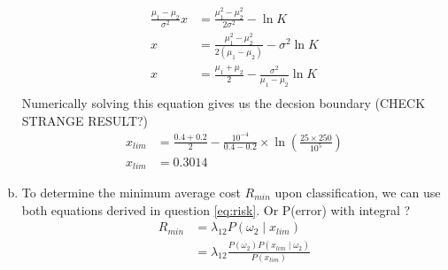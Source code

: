 \documentclass[a4paper, 10pt, twoside]{article}
\begin{document}
\begin{enumerate}[a)]
\begin{align*}
              \frac{\mu_1-\mu_2}{\sigma^2}x                                           & = \frac{\mu_1^2-\mu_2^2}{2\sigma^2} - \ln K                     \\
              x                                                                     & = \frac{\mu_1^2-\mu_2^2}{2(\mu_1-\mu_2)} - \sigma^2\ln K        \\
              x                                                                     & = \frac{\mu_1 + \mu_2}{2} - \frac{\sigma^2}{\mu_1-\mu_2}\ln K   \\
          \end{align*}
          Numerically solving this equation gives us the decsion boundary (CHECK STRANGE RESULT?)
          \begin{align*}
              x_{lim} & = \frac{0.4 + 0.2}{2} - \frac{10^{-4}}{0.4-0.2} \times \ln (\frac{25\times250}{10^5}) \\
              x_{lim} & = 0.3014 
          \end{align*}
    \item To determine the minimum average cost $R_{min}$ upon classification, we can use both equations derived in question \ref{eq:risk}. Or P(error) with integral ?
          \begin{align*}
              R_{min} & = \lambda_{12}P(\omega_2 \mid x_{lim})                                  \\
                      & = \lambda_{12}\frac{P(\omega_2)P(x_{lim} \mid \omega_2)}{P(x_{lim})} \\
          \end{align*}
\end{enumerate}
\end{document}
